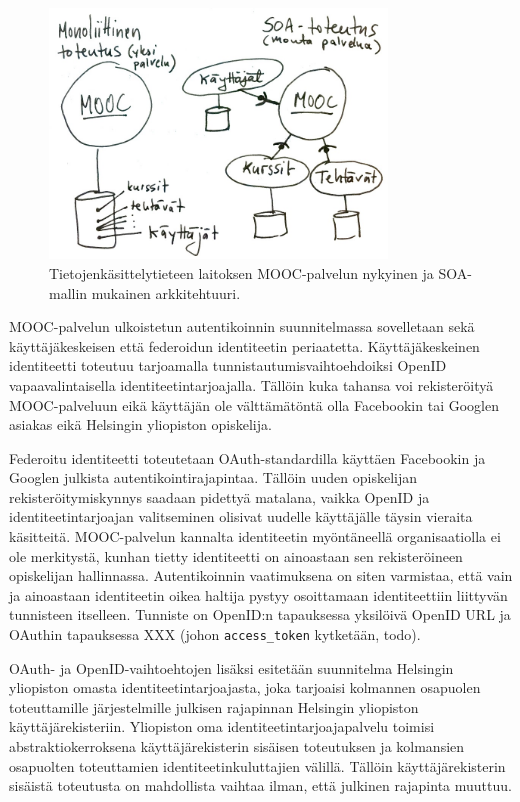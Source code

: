 \documentclass[finnish,gradu]{tktltiki}
\begin{document}
  \begin{figure}[h!]
    \centering
    \includegraphics[width=0.8\textwidth]{images/mooc-arkkitehtuuri.jpg}
    \caption{Tietojenkäsittelytieteen laitoksen MOOC-palvelun nykyinen ja SOA-mallin mukainen arkkitehtuuri.}
    \label{fig:mooc-arkkitehtuuri}
  \end{figure}

  MOOC-palvelun ulkoistetun autentikoinnin suunnitelmassa sovelletaan sekä käyttäjäkeskeisen että federoidun identiteetin periaatetta. Käyttäjäkeskeinen identiteetti toteutuu tarjoamalla tunnistautumisvaihtoehdoiksi OpenID vapaavalintaisella identiteetintarjoajalla. Tällöin kuka tahansa voi rekisteröityä MOOC-palveluun eikä käyttäjän ole välttämätöntä olla Facebookin tai Googlen asiakas eikä Helsingin yliopiston opiskelija.

  Federoitu identiteetti toteutetaan OAuth-standardilla käyttäen Facebookin ja Googlen julkista autentikointirajapintaa. Tällöin uuden opiskelijan rekisteröitymiskynnys saadaan pidettyä matalana, vaikka OpenID ja identiteetintarjoajan valitseminen olisivat uudelle käyttäjälle täysin vieraita käsitteitä. MOOC-palvelun kannalta identiteetin myöntäneellä organisaatiolla ei ole merkitystä, kunhan tietty identiteetti on ainoastaan sen rekisteröineen opiskelijan hallinnassa. Autentikoinnin vaatimuksena on siten varmistaa, että vain ja ainoastaan identiteetin oikea haltija pystyy osoittamaan identiteettiin liittyvän tunnisteen itselleen. Tunniste on OpenID:n tapauksessa yksilöivä OpenID URL ja OAuthin tapauksessa XXX (johon \verb#access_token# kytketään, todo).

  OAuth- ja OpenID-vaihtoehtojen lisäksi esitetään suunnitelma Helsingin yliopiston omasta identiteetintarjoajasta, joka tarjoaisi kolmannen osapuolen toteuttamille järjestelmille julkisen rajapinnan Helsingin yliopiston käyttäjärekisteriin. Yliopiston oma identiteetintarjoajapalvelu toimisi abstraktiokerroksena käyttäjärekisterin sisäisen toteutuksen ja kolmansien osapuolten toteuttamien identiteetinkuluttajien välillä. Tällöin käyttäjärekisterin sisäistä toteutusta on mahdollista vaihtaa ilman, että julkinen rajapinta muuttuu.
\end{document}
